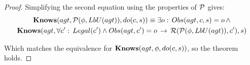 \begin{proof}
Simplifying the second equation using the properties of $\mathcal{P}$ gives:\begin{multline*}
\mathbf{Knows}(agt,\mathcal{P}(\phi,LbU(agt)),do(c,s))\equiv\exists o:\, Obs(agt,c,s)=o\,\wedge\\
\mathbf{Knows}(agt,\forall c':\, Legal(c')\wedge Obs(agt,c')=o\,\rightarrow\,\mathcal{R}(\mathcal{P}(\phi,LbU(agt)),c'),s)\end{multline*}


Which matches the equivalence for $\mathbf{Knows}(agt,\phi,do(c,s))$, so
the theorem holds. 
\end{proof}
\medskip{}


